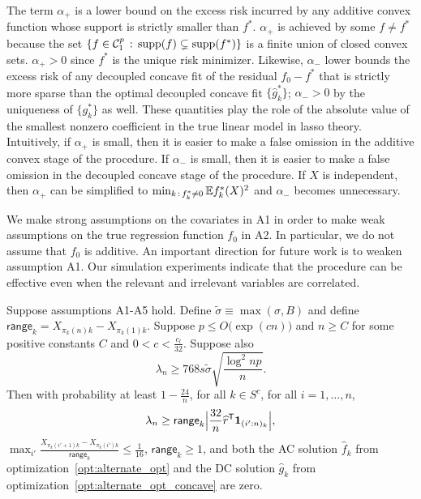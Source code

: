 The term $\alpha_+$ is a lower bound on the excess risk incurred by
any additive convex function whose support is strictly smaller than
$f^*$. $\alpha_+$ is achieved by some $f \neq f^*$ because the set
$\{f\in \mathcal{C}_1^p\,:\, \textrm{supp}(f) \subsetneq
\textrm{supp}(f^*)\}$ is a finite union of closed convex
sets. $\alpha_+ > 0$ since $f^*$ is the unique risk
minimizer. Likewise, $\alpha_-$ lower bounds the excess risk of any
decoupled concave fit of the residual $f_0 - f^*$ that is strictly
more sparse than the optimal decoupled concave fit $\{\hat{g}_k^*\}$;
$\alpha_- > 0$ by the uniqueness of $\{g^*_k\}$ as well. These
quantities play the role of the absolute value of the smallest nonzero
coefficient in the true linear model in lasso theory.  Intuitively, if
$\alpha_{+}$ is small, then it is easier to make a false omission in
the additive convex stage of the procedure. If $\alpha_{-}$ is small,
then it is easier to make a false omission in the decoupled concave
stage of the procedure. If $X$ is independent, then $\alpha_+$ can be
simplified to $\min_{k \,:\, f^*_k \neq 0} {\mathbb E} f^*_k(X)^2$ and
$\alpha_-$ becomes unnecessary.

\begin{remark}
  We make strong assumptions on the covariates in A1 in order to make
  weak assumptions on the true regression function $f_0$ in
  A2. In particular, we do not assume that $f_0$ is additive. An
  important direction for future work is to weaken assumption A1.
  Our simulation experiments indicate that the procedure can be
  effective even when the relevant and irrelevant variables are correlated.
\end{remark}


\begin{theorem}
\label{thm:false_positive}
Suppose assumptions A1-A5 hold. Define $\tilde{\sigma} \equiv \max(\sigma, B)$ and define $\mathsf{range}_k = X_{\pi_k(n)k} - X_{\pi_k(1)k}$. Suppose $p \leq O\big( \exp(c n) \big)$ and $n \geq C$ for some positive constants $C$ and $0 < c < \frac{c_l}{32}$.  Suppose also
\begin{equation}
\lambda_n \geq 768 s \tilde{\sigma}  \sqrt{ \frac{\log^2 np}{n}}.
\end{equation}  
Then with probability at least $ 1 - \frac{24}{n}$, for all $k \in
S^c$, for all $i=1,\ldots,n$,
\begin{equation}
\lambda_n \geq \mathsf{range}_k \Big| \frac{32}{n}\widehat{r}^{\mathsf{T}} \mbox{\boldmath $1$}_{(i':n)_k} \Big| ,
\end{equation}
$\max_{i'} \frac{X_{\pi_k(i'+1)k} - X_{\pi_k(i')k}}{\mathsf{range}_k} \leq \frac{1}{16}$, $\mathsf{range}_k \geq 1$, and both the AC solution $\hat{f}_k$ from optimization~\eqref{opt:alternate_opt} and the DC solution $\hat{g}_k$ from optimization~\eqref{opt:alternate_opt_concave} are zero. 
\end{theorem}

